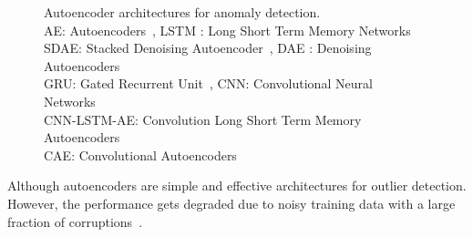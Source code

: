 \begin{figure}
\centering
{}
\caption{   {Autoencoder architectures for anomaly detection}.
        \\AE: Autoencoders~\cite{liou2014autoencoder}, LSTM : Long Short Term Memory Networks~\cite{hochreiter1997long}
        \\SDAE: Stacked Denoising Autoencoder~\cite{vincent2010stacked}, DAE : Denoising Autoencoders~\cite{vincent2010stacked}
        \\GRU: Gated Recurrent Unit~\cite{cho2014learning}, CNN: Convolutional Neural Networks~\cite{krizhevsky2012imagenet}
        \\CNN-LSTM-AE: Convolution Long Short Term Memory Autoencoders~\cite{haque2018image}
        \\CAE: Convolutional Autoencoders~\cite{masci2011stacked}
        }

 \label{fig:aevariants}
\end{figure}
Although autoencoders are simple and effective architectures for outlier detection. However, the performance gets degraded  due to noisy training data with a large fraction of corruptions~\cite{zhou2017anomaly}.


